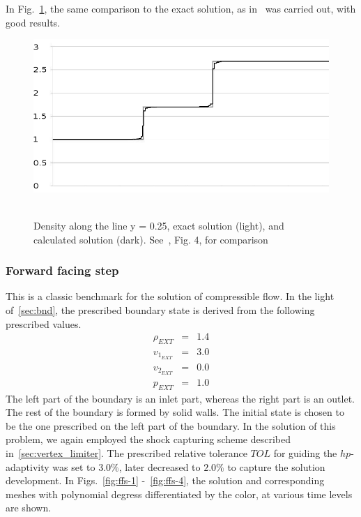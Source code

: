 In Fig.~\ref{fig:rs-11}, the same comparison to the exact solution, as in~\cite{reflected} was carried out, with good results.
\begin{figure}[H]
\begin{center}
\includegraphics[width=\textwidth]{examples_img/reflected-shock/density.png}\ \ \ 
\end{center}

\caption{Density along the line y = 0.25, exact solution (light), and calculated solution (dark). See~\cite{reflected}, Fig. 4, for comparison}

\label{fig:rs-11}
\end{figure}	

\subsubsection{Forward facing step}
This is a classic benchmark for the solution of compressible flow.
In the light of~\ref{sec:bnd}, the prescribed boundary state is derived from the following prescribed values.
\begin{eqnarray}
\rho_{EXT} & = & 1.4 \\
v_{1_{EXT}} & = & 3.0 \\
v_{2_{EXT}} & = & 0.0 \\
p_{EXT} & = & 1.0
\end{eqnarray}
The left part of the boundary is an inlet part, whereas the right part is an outlet. The rest of the boundary is formed by solid walls.
The initial state is chosen to be the one prescribed on the left part of the boundary.
In the solution of this problem, we again employed the shock capturing scheme described in~\ref{sec:vertex_limiter}.
The prescribed relative tolerance $TOL$ for guiding the $hp$-adaptivity was set to $3.0\%$, later decreased to $2.0\%$ to capture the solution development.
In Figs.~\ref{fig:ffs-1} -~\ref{fig:ffs-4}, the solution and corresponding meshes with polynomial degress differentiated by the color, at various time levels are shown.

